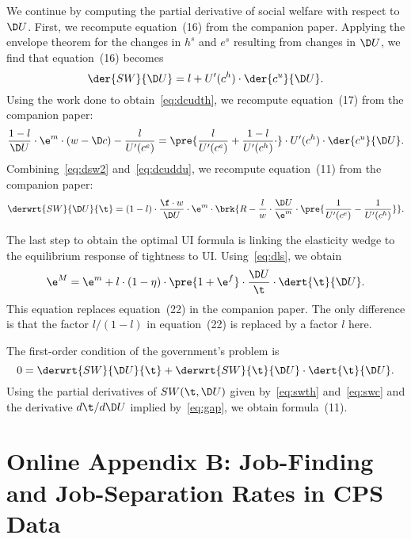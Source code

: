 \documentclass[letterpaper,12pt,leqno]{article}
\begin{document}
We continue by computing the partial derivative of social welfare with respect to $\D U$. First, we recompute equation~(16) from the companion paper. Applying the envelope theorem for the changes in $h^{s}$ and $e^{s}$ resulting from changes in $\D U$, we find that equation~(16) becomes
\begin{equation}
\der{SW}{\D U}= l +U'(c^{h})\cdot \der{c^{u}}{\D U}.
\label{eq:dsw2}\end{equation}
Using the work done to obtain~\eqref{eq:dcudth}, we recompute equation~(17) from the companion paper:
\begin{equation}
\frac{1-l}{\D U}\cdot \e^{m} \cdot (w-\D c)-\frac{l}{U'(c^{e})}=\pre{\frac{l}{U'(c^{e})}+\frac{1-l}{U'(c^{h})}\cdot }\cdot U'(c^{h}) \cdot \der{c^{u}}{\D U}.
\label{eq:dcuddu}\end{equation}
Combining~\eqref{eq:dsw2} and~\eqref{eq:dcuddu}, we recompute equation~(11) from the companion paper:
\begin{equation}
\derwrt{SW}{\D U}{\t} =  (1-l)\cdot \frac{\f\cdot w}{\D U}\cdot \e^{m}\cdot \brk{R-\frac{l}{w}\cdot \frac{\D U}{\e^{m}}\cdot\pre{\frac{1}{U'(c^{e})}-\frac{1}{U'(c^{h})}}}.
\label{eq:swc}\end{equation}

The last step to obtain the optimal UI formula is linking the elasticity wedge to the equilibrium response of tightness to UI. Using~\eqref{eq:dls}, we obtain 
\begin{equation}
\e^{M}=\e^{m}+l\cdot (1-\eta)\cdot \pre{1+\e^{f}}\cdot\frac{\D U}{\t} \cdot \dert{\t}{\D U}.
\label{eq:gap}\end{equation}
This equation replaces equation~(22) in the companion paper. The only difference is that the factor $l/(1-l)$ in equation~(22) is replaced by a factor $l$ here.

The first-order condition  of the government's problem is
\begin{equation*}
0=\derwrt{SW}{\D U}{\t} + \derwrt{SW}{\t}{\D U}\cdot \dert{\t}{\D U}.
\end{equation*}
Using the partial derivatives of $SW(\t,\D U)$ given by~\eqref{eq:swth} and~\eqref{eq:swc} and the derivative $d\t/d\D U$ implied by~\eqref{eq:gap}, we obtain formula~(11).

\section{Online Appendix B: Job-Finding and Job-Separation Rates in CPS Data}\label{app:cps}
\end{document}
